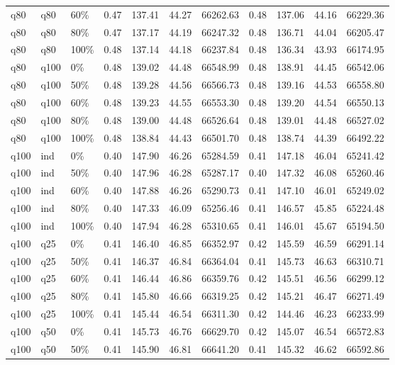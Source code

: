 \begin{longtable}{lllrrrrrrrr}
  q80 & q80 & 60\% & 0.47 & 137.41 & 44.27 & 66262.63 & 0.48 & 137.06 & 44.16 & 66229.36 \\ 
  q80 & q80 & 80\% & 0.47 & 137.17 & 44.19 & 66247.32 & 0.48 & 136.71 & 44.04 & 66205.47 \\ 
  q80 & q80 & 100\% & 0.48 & 137.14 & 44.18 & 66237.84 & 0.48 & 136.34 & 43.93 & 66174.95 \\ 
  q80 & q100 & 0\% & 0.48 & 139.02 & 44.48 & 66548.99 & 0.48 & 138.91 & 44.45 & 66542.06 \\ 
  q80 & q100 & 50\% & 0.48 & 139.28 & 44.56 & 66566.73 & 0.48 & 139.16 & 44.53 & 66558.80 \\ 
  q80 & q100 & 60\% & 0.48 & 139.23 & 44.55 & 66553.30 & 0.48 & 139.20 & 44.54 & 66550.13 \\ 
  q80 & q100 & 80\% & 0.48 & 139.00 & 44.48 & 66526.64 & 0.48 & 139.01 & 44.48 & 66527.02 \\ 
  q80 & q100 & 100\% & 0.48 & 138.84 & 44.43 & 66501.70 & 0.48 & 138.74 & 44.39 & 66492.22 \\ 
  q100 & ind & 0\% & 0.40 & 147.90 & 46.26 & 65284.59 & 0.41 & 147.18 & 46.04 & 65241.42 \\ 
  q100 & ind & 50\% & 0.40 & 147.96 & 46.28 & 65287.17 & 0.40 & 147.32 & 46.08 & 65260.46 \\ 
  q100 & ind & 60\% & 0.40 & 147.88 & 46.26 & 65290.73 & 0.41 & 147.10 & 46.01 & 65249.02 \\ 
  q100 & ind & 80\% & 0.40 & 147.33 & 46.09 & 65256.46 & 0.41 & 146.57 & 45.85 & 65224.48 \\ 
  q100 & ind & 100\% & 0.40 & 147.94 & 46.28 & 65310.65 & 0.41 & 146.01 & 45.67 & 65194.50 \\ 
  q100 & q25 & 0\% & 0.41 & 146.40 & 46.85 & 66352.97 & 0.42 & 145.59 & 46.59 & 66291.14 \\ 
  q100 & q25 & 50\% & 0.41 & 146.37 & 46.84 & 66364.04 & 0.41 & 145.73 & 46.63 & 66310.71 \\ 
  q100 & q25 & 60\% & 0.41 & 146.44 & 46.86 & 66359.76 & 0.42 & 145.51 & 46.56 & 66299.12 \\ 
  q100 & q25 & 80\% & 0.41 & 145.80 & 46.66 & 66319.25 & 0.42 & 145.21 & 46.47 & 66271.49 \\ 
  q100 & q25 & 100\% & 0.41 & 145.44 & 46.54 & 66311.30 & 0.42 & 144.46 & 46.23 & 66233.99 \\ 
  q100 & q50 & 0\% & 0.41 & 145.73 & 46.76 & 66629.70 & 0.42 & 145.07 & 46.54 & 66572.83 \\ 
  q100 & q50 & 50\% & 0.41 & 145.90 & 46.81 & 66641.20 & 0.41 & 145.32 & 46.62 & 66592.86 \\ 

\end{longtable}
